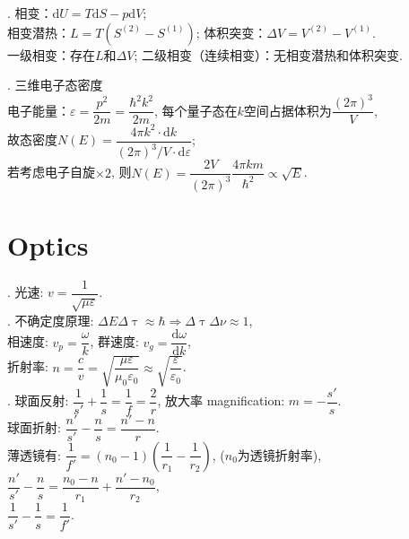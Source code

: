 \documentclass[12pt, 
]{article}
\begin{document}
. 相变：$\mathrm{d}U=T\mathrm{d}S-p\mathrm{d}V$;
~\\\phantom{~~~~~}相变潜热：$L=T(S^{(2)}-S^{(1)})$; 体积突变：$\Delta V=V^{(2)}-V^{(1)}$.
~\\\phantom{~~~~~}一级相变：存在$L$和$\Delta V$; 二级相变（连续相变）：无相变潜热和体积突变.
~\\

. 三维电子态密度
~\\\phantom{~~~~~}电子能量：$\varepsilon=\dfrac{p^2}{2m}=\dfrac{\hbar^2k^2}{2m}$, 每个量子态在$k$空间占据体积为$\dfrac{(2\pi)^3}{V}$,~\\\phantom{~~~~~}故态密度$N(E)=\dfrac{4\pi k^2\cdot\mathrm{d}k}{(2\pi)^3/V\cdot\mathrm{d}\varepsilon}$;
~\\\phantom{~~~~~}若考虑电子自旋$\times2$, 则$N(E)=\dfrac{2V}{(2\pi)^3}\dfrac{4\pi km}{\hbar^2}\propto\sqrt{E}$.

\newpage
\section{Optics}
. 光速: $v=\dfrac{1}{\sqrt{\mu\varepsilon}}$.
~\\

. 不确定度原理: $\Delta E\Delta\uptau\approx\hbar\Rightarrow\Delta\uptau\Delta\nu\approx 1$,
~\\\phantom{~~~~}相速度: $v_p=\dfrac{\omega}{k}$, 群速度: $v_g=\dfrac{\mathrm{d}\omega}{\mathrm{d}k}$,
~\\\phantom{~~~~}折射率: $n=\dfrac{c}{v}=\sqrt{\dfrac{\mu\varepsilon}{\mu_0\varepsilon_0}}\approx\sqrt{\dfrac{\varepsilon}{\varepsilon_0}}$.
~\\

. 球面反射: $\dfrac{1}{s'}+\dfrac{1}{s}=\dfrac{1}{f}=\dfrac{2}{r}$, 放大率 magnification: $m=-\dfrac{s'}{s}$.
~\\\phantom{~~~~}球面折射: $\dfrac{n'}{s'}-\dfrac{n}{s}=\dfrac{n'-n}{r}$.
~\\\phantom{~~~~}薄透镜有: $\dfrac{1}{f'}=(n_0-1)(\dfrac{1}{r_1}-\dfrac{1}{r_2})$, ($n_0$为透镜折射率),
~\\\phantom{~~~~薄透镜有:~}$\dfrac{n'}{s'}-\dfrac{n}{s}=\dfrac{n_0-n}{r_1}+\dfrac{n'-n_0}{r_2}$,
~\\\phantom{~~~~薄透镜有:~}$\dfrac{1}{s'}-\dfrac{1}{s}=\dfrac{1}{f'}$.
~\\
\end{document}
